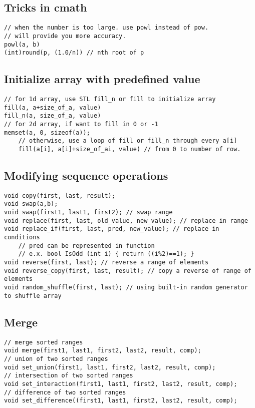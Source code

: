 \documentclass[a4paper]{article}
\begin{document}
\subsection{Tricks in cmath}
\begin{verbatim}
// when the number is too large. use powl instead of pow.
// will provide you more accuracy.
powl(a, b)
(int)round(p, (1.0/n)) // nth root of p
\end{verbatim}

\subsection{Initialize array with predefined value}
\begin{verbatim}
// for 1d array, use STL fill_n or fill to initialize array
fill(a, a+size_of_a, value)
fill_n(a, size_of_a, value)
// for 2d array, if want to fill in 0 or -1
memset(a, 0, sizeof(a));
	// otherwise, use a loop of fill or fill_n through every a[i]
	fill(a[i], a[i]+size_of_ai, value) // from 0 to number of row.
\end{verbatim}

\subsection{Modifying sequence operations}

\begin{verbatim}
void copy(first, last, result);
void swap(a,b);
void swap(first1, last1, first2); // swap range
void replace(first, last, old_value, new_value); // replace in range
void replace_if(first, last, pred, new_value); // replace in conditions
	// pred can be represented in function
	// e.x. bool IsOdd (int i) { return ((i%2)==1); }
void reverse(first, last); // reverse a range of elements
void reverse_copy(first, last, result); // copy a reverse of range of elements
void random_shuffle(first, last); // using built-in random generator to shuffle array
\end{verbatim}

\subsection{Merge}

\begin{verbatim}
// merge sorted ranges
void merge(first1, last1, first2, last2, result, comp);
// union of two sorted ranges
void set_union(first1, last1, first2, last2, result, comp);
// intersection of two sorted ranges
void set_interaction(first1, last1, first2, last2, result, comp);
// difference of two sorted ranges
void set_difference((first1, last1, first2, last2, result, comp);
\end{verbatim}
\end{document}
